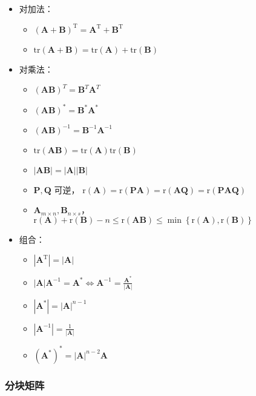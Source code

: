 \documentclass{ctexart}
\newcommand{\。}{．} %
\newcommand{\tr}{\mathrm{tr}}
\newcommand{\rr}{\mathrm{r}}
\newcommand{\T}{\mathrm{T}}
\newcommand{\A}{\bm{A}}
\newcommand{\B}{\bm{B}}
\theoremstyle{t} %
\begin{document}
\begin{itemize}
    \item 对加法：
    \begin{itemize}
        \item $(\bm{A} + \bm{B})^\T = \bm{A}^\T + \bm{B}^\T$
        \item $\tr(\bm{A} + \bm{B}) = \tr(\bm{A}) + \tr(\bm{B})$
    \end{itemize}
    \item 对乘法：
    \begin{itemize}
        \item $(\bm{A}\bm{B})^T = \bm{B}^T\bm{A}^T$
        \item $(\bm{A}\bm{B})^* = \bm{B}^*\bm{A}^*$
        \item $(\bm{A}\bm{B})^{-1} = \bm{B}^{-1}\bm{A}^{-1}$
        \item $\tr(\bm{A}\bm{B}) = \tr(\bm{A})\tr(\bm{B})$
        \item $\left\lvert \bm{A}\bm{B}\right\rvert  = \left\lvert \bm{A}\right\rvert \left\lvert \bm{B}\right\rvert $
        \item $\bm{P}, \bm{Q}$ 可逆， $\rr(\A) = \rr(\bm{P}\A) = \rr(\A\bm{Q}) = \rr(\bm{P}\A\bm{Q})$
        \item $\A_{m \times n}, \B_{n \times s}$， $\rr(\A) + \rr(\B) - n \leqslant \rr(\A\B) \leqslant\min\left\{\rr(\A), \rr(\B)\right\}$
    \end{itemize}
    \item 组合：
    \begin{itemize}
        \item $\left\lvert \bm{A}^\T\right\rvert = \left\lvert \A\right\rvert $
        \item $\left\lvert \bm{A}\right\rvert \bm{A}^{-1} = \bm{A}^* \Leftrightarrow \bm{A}^{-1} = \frac{\A^*}{\left\lvert \A\right\rvert }$
        \item $\left\lvert \A^*\right\rvert = \left\lvert \A\right\rvert^{n - 1} $
        \item $\left\lvert \A^{-1}\right\rvert =\frac{1}{\left\lvert \A\right\rvert} $
        \item $\left(\A^*\right)^* = \left\lvert \A\right\rvert^{n - 2}\A $
    \end{itemize}
\end{itemize}

\subsubsection{分块矩阵}
\end{document}
